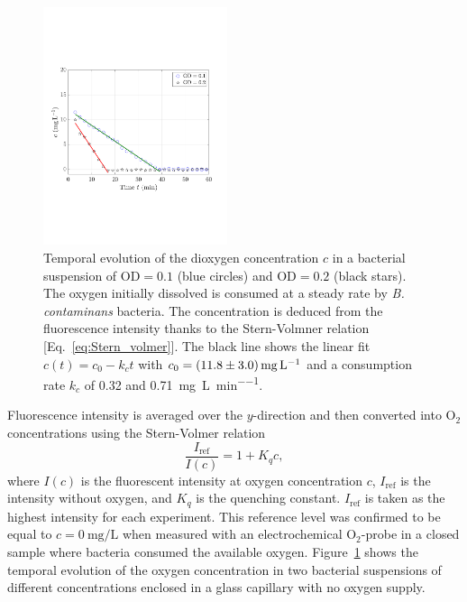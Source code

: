 \documentclass[aps,a4paper,twocolumn,10pt,pre,showpacs]{revtex4-2}
\begin{document}
\begin{figure}[b]
\includegraphics[trim = 10mm 62mm 18mm 70mm, clip, width=0.48\textwidth, angle=0]{FigAA.pdf} 
\caption{Temporal evolution of the dioxygen concentration $c$ in a bacterial suspension of $\mathrm{OD}=0.1$ (blue circles) and $\mathrm{OD}=0.2$ (black stars). The oxygen initially dissolved is consumed at a steady rate by \emph{B. contaminans} bacteria. The concentration is deduced from the fluorescence intensity thanks to the Stern-Volmner relation [Eq.~\eqref{eq:Stern_volmer}]. The black line shows the linear fit $c(t)=c_0-k_c t$ with $c_0=\SI{11.8\pm3}{\mg\per\liter}$ and a consumption rate $k_c$ of 0.32 and \SI{0.71}{\mg\per\liter\per\minute}.}
\label{fig:SM_O2}
\end{figure}

Fluorescence intensity is averaged over the $y$-direction and then converted into O$_2$ concentrations using the Stern-Volmer relation
\begin{equation}
\label{eq:Stern_volmer}
    \dfrac{I_\mathrm{ref}}{I(c)} = 1 + K_q c,
\end{equation}
where $I(c)$ is the fluorescent intensity at oxygen concentration $c$, $I_\mathrm{ref}$ is the intensity without oxygen, and $K_q$ is the quenching constant. $I_\mathrm{ref}$ is taken as the highest intensity for each experiment. This reference level was confirmed to be equal to $c=\SI{0}{\mg\per\liter}$ when measured with an electrochemical O$_2$-probe in a closed sample where bacteria consumed the available oxygen. Figure~\ref{fig:SM_O2} shows the temporal evolution of the oxygen concentration in two bacterial suspensions of different concentrations enclosed in a glass capillary with no oxygen supply.
\end{document}
